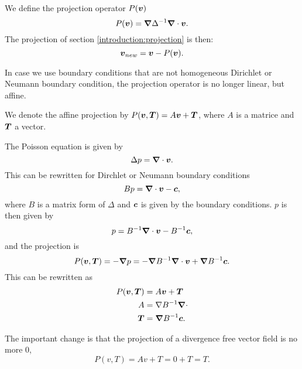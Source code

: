 \begin{definition}
\label{introduction:projectiondef}
We define the projection operator $P({\boldsymbol {v}})$
  \begin{equation}
    P({\boldsymbol {v}})={\boldsymbol {\nabla}}\Delta^{-1}{\boldsymbol {\nabla}}\cdot {\boldsymbol {v}}.
  \end{equation}
  The projection of section \ref{introduction:projection} is then:
  \begin{equation}
    {\boldsymbol {v}}_{new}={\boldsymbol {v}}-P({\boldsymbol {v}}).
  \end{equation}
\end{definition}
  In case we use boundary conditions that are not homogeneous Dirichlet or Neumann boundary condition,
  the projection operator is no longer linear, but affine.

  \begin{definition}
  We denote the affine projection by $P({\boldsymbol {v}},{\boldsymbol {T}})=A{\boldsymbol {v}}+{\boldsymbol {T}}$, where $A$ is a matrice and ${\boldsymbol {T}}$ a vector.
  
  The Poisson equation is given by
  \begin{equation}
   \Delta p={\boldsymbol {\nabla}} \cdot {\boldsymbol {v}}.
  \end{equation}
This can be rewritten for Dirchlet or Neumann boundary conditions
\begin{equation}
 B p={\boldsymbol {\nabla}} \cdot {\boldsymbol {v}}-{\boldsymbol {c}},
\end{equation}
where $B$ is a matrix form of $\Delta$ and ${\boldsymbol {c}}$ is given by the boundary conditions.
$p$ is then given by
\begin{equation}
 p=B^{-1} {\boldsymbol {\nabla}} \cdot {\boldsymbol {v}}-B^{-1}{\boldsymbol {c}},
\end{equation}
and the projection is
\begin{equation}
 P({\boldsymbol {v}},{\boldsymbol {T}})=-{\boldsymbol {\nabla}} p=-{\boldsymbol {\nabla}} B^{-1}{\boldsymbol {\nabla}} \cdot {\boldsymbol {v}}+{\boldsymbol {\nabla}} B^{-1}{\boldsymbol {c}}.
\end{equation}
This can be rewritten as
\begin{align}
P({\boldsymbol {v}},{\boldsymbol {T}})&=A{\boldsymbol {v}}+{\boldsymbol {T}}\\
A&=\nabla B^{-1}{\boldsymbol {\nabla}} \cdot\\
{\boldsymbol {T}}&={\boldsymbol {\nabla}} B^{-1}{\boldsymbol {c}}.
\end{align}
  
  \end{definition}
  
  The important change is that the projection of a divergence free vector field is no more 0,
  \begin{equation}
  P(v,T)=Av+T=0+T=T.
  \end{equation}



